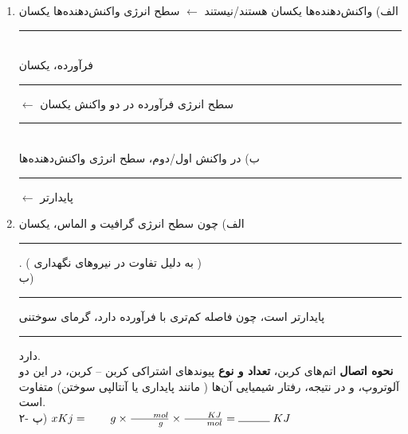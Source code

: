 \documentclass[a4paper,12pt]{article}
\newenvironment{en}
	{\begin{enumerate}\setlength\itemsep{-0.2em}}
	{\end{enumerate}}
\newcommand{\ff}{\rule{1cm}{0.15mm}\;}
\begin{document}
\begin{en}
	
	\item  الف) واکنش‌دهنده‌ها یکسان هستند/نیستند $\leftarrow$ سطح انرژی واکنش‌دهنده‌ها یکسان \ff
	\\
 فرآورده، یکسان \ff $\leftarrow$ سطح انرژی فرآورده در دو واکنش یکسان \ff
 	\\
 	ب) در واکنش اول/دوم، سطح انرژی واکنش‌دهنده‌ها \ff $\leftarrow$ پایدارتر
 	\item  الف) چون سطح انرژی گرافیت و الماس، یکسان \ff . ( به دلیل تفاوت در نیرو‌های نگهداری )
 	\\
 	 ب) \ff پایدار‌تر است، چون فاصله کم‌تری با فرآورده دارد، گرمای سوختنی \ff دارد.
 	\\
	\textbf{	نحوه اتصال }
	اتم‌های کربن، 
	\textbf{تعداد و نوع }
	پیوند‌های اشتراکی کربن – کربن، در این دو آلوتروپ، و در نتیجه، رفتار شیمیایی آن‌ها ( مانند پایداری یا آنتالپی سوختن) متفاوت است.
	\\
	۲- پ) 
	\qquad\qquad\qquad\qquad
 	$xKj = \qquad g \times \frac{\qquad mol}{\qquad g}\times\frac{\qquad KJ}{\qquad mol}=\ff KJ$
 	
\end{en}

\newpage

\end{document}
